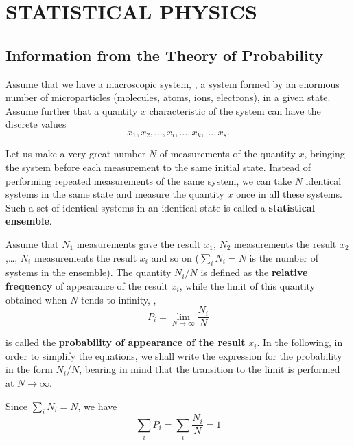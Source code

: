 

\chapter{STATISTICAL PHYSICS}\label{chap:11}

\section{Information from the Theory of Probability}\label{sec:11_1}

Assume that we have a macroscopic system, \ie, a system formed by an enormous number of microparticles (molecules, atoms, ions, electrons), in a given state. Assume further that a quantity $x$ characteristic of the system can have the discrete values
\begin{equation*}
	x_1, x_2, \ldots, x_i, \ldots, x_k, \ldots, x_s.
\end{equation*}

Let us make a very great number $N$ of measurements of the quantity $x$, bringing the system before each measurement to the same initial state. Instead of performing repeated measurements of the same system, we can take $N$ identical systems in the same state and measure the quantity $x$ once in all these systems. Such a set of identical systems in an identical state is called a \textbf{statistical ensemble}.

Assume that $N_1$ measurements gave the result $x_1$, $N_2$ measurements the result $x_2$,\ldots, $N_i$ measurements the result $x_i$ and so on ($\sum_i N_i=N$ is the number of systems in the ensemble). The quantity $N_i/N$ is defined as the \textbf{relative frequency} of appearance of the result $x_i$, while the limit of this quantity obtained when $N$ tends to infinity, \ie,
\begin{equation}\label{eq:11_1}
	P_i = \lim_{N\to\infty} \frac{N_i}{N}
\end{equation}

\noindent
is called the \textbf{probability of appearance of the result} $x_i$. In the following, in order to simplify the equations, we shall write the expression for the probability in the form $N_i/N$, bearing in mind that the transition to the limit is performed at $N\to\infty$.

Since $\sum_i N_i=N$, we have
\begin{equation}\label{eq:11_2}
	\sum_i P_i = \sum_i \frac{N_i}{N} = 1
\end{equation}

